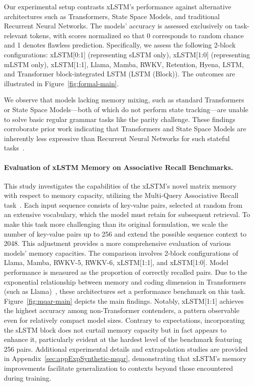Our experimental setup contrasts xLSTM’s performance against alternative architectures such as Transformers, State Space Models, and traditional Recurrent Neural Networks. The models' accuracy is assessed exclusively on task-relevant tokens, with scores normalized so that 0 corresponds to random chance and 1 denotes flawless prediction. Specifically, we assess the following 2-block configurations: xLSTM[0:1] (representing sLSTM only), xLSTM[1:0] (representing mLSTM only), xLSTM[1:1], Llama, Mamba, RWKV, Retention, Hyena, LSTM, and Transformer block-integrated LSTM (LSTM (Block)). The outcomes are illustrated in Figure~\ref{fig:formal-main}. 

We observe that models lacking memory mixing, such as standard Transformers or State Space Models—both of which do not perform state tracking—are unable to solve basic regular grammar tasks like the parity challenge. These findings corroborate prior work indicating that Transformers and State Space Models are inherently less expressive than Recurrent Neural Networks for such stateful tasks~\citep{Merrill:24, Merrill:23, Deletang:23}.

\paragraph{Evaluation of xLSTM Memory on Associative Recall Benchmarks.} This study investigates the capabilities of the xLSTM’s novel matrix memory with respect to memory capacity, utilizing the Multi-Query Associative Recall task~\citep{Arora:23arxiv}. Each input sequence consists of key-value pairs, selected at random from an extensive vocabulary, which the model must retain for subsequent retrieval. To make this task more challenging than its original formulation, we scale the number of key-value pairs up to 256 and extend the possible sequence context to 2048. This adjustment provides a more comprehensive evaluation of various models' memory capacities. The comparison involves 2-block configurations of Llama, Mamba, RWKV-5, RWKV-6, xLSTM[1:1], and xLSTM[1:0]. Model performance is measured as the proportion of correctly recalled pairs. Due to the exponential relationship between memory and coding dimension in Transformers (such as Llama)~\citep{Ramsauer:21}, these architectures set a performance benchmark on this task. Figure~\ref{fig:mqar-main} depicts the main findings. Notably, xLSTM[1:1] achieves the highest accuracy among non-Transformer contenders, a pattern observable even for relatively compact model sizes. Contrary to expectations, incorporating the sLSTM block does not curtail memory capacity but in fact appears to enhance it, particularly evident at the hardest level of the benchmark featuring 256 pairs. Additional experimental details and extrapolation studies are provided in Appendix~\ref{sec:appExpSynthetic-mqar}, demonstrating that xLSTM’s memory improvements facilitate generalization to contexts beyond those encountered during training.

